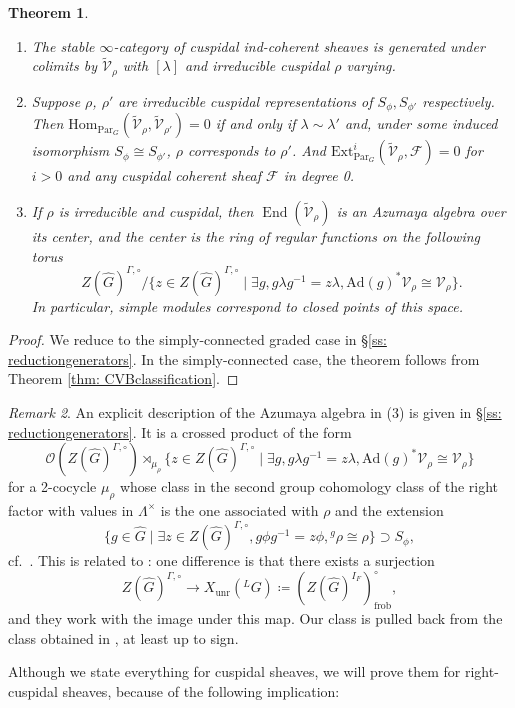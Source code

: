 \documentclass{amsart}
\newtheorem{theorem}{Theorem}[subsection]
\theoremstyle{definition}
\theoremstyle{remark}
\newtheorem{remark}[theorem]{Remark}
\numberwithin{equation}{section}
\newcommand{\mc}{\mathcal}
\newcommand{\Hom}{\mathrm{Hom}}
\DeclareMathOperator{\End}{End}
\newcommand{\wh}{\widehat}
\newcommand{\frob}{\mathrm{frob}}
\newcommand{\Par}{\mathrm{Par}}
\begin{document}
\begin{theorem}\label{thm: Generators}
\begin{enumerate}
    \item The stable $\infty$-category of cuspidal ind-coherent sheaves is generated under colimits by $\widetilde{\mc V}_{\rho}$ with $[\lambda]$ and irreducible cuspidal $\rho$ varying.  
    \item Suppose $\rho$, $\rho'$ are irreducible cuspidal representations of $S_{\phi}, S_{\phi'}$ respectively. Then $\Hom_{\Par_G}(\widetilde{\mc V}_{\rho}, \widetilde{\mc V}_{\rho'})=0$ if and only if $\lambda \sim \lambda'$ and, under some induced isomorphism $S_{\phi}\cong S_{\phi'}$, $\rho$ corresponds to $\rho'$. And $\mathrm{Ext}^i_{\Par_G} (\widetilde{\mc V}_{\rho}, \mc F)=0$ for $i>0$ and any cuspidal coherent sheaf $\mc F$ in degree 0. 
    \item If $\rho$ is irreducible and cuspidal, then $\End (\widetilde{\mc V}_{\rho})$ is an Azumaya algebra over its center, and the center is the ring of regular functions on the following torus
    \[
    Z(\wh G)^{\Gamma, \circ}/\{z\in Z(\wh G)^{\Gamma, \circ}\mid \exists g, g\lambda g^{-1}=z\lambda,  \mathrm{Ad}(g)^* \mc V_\rho\cong \mc V_\rho\}. 
    \] 
    In particular, simple modules correspond to closed points of this space.
    \end{enumerate}
\end{theorem}
\begin{proof}
    We reduce to the simply-connected graded case in \S\ref{ss: reductiongenerators}. In the simply-connected case, the theorem follows from Theorem \ref{thm: CVBclassification}.
\end{proof}

\begin{remark}\label{rem: Azumaya}
An explicit description of the Azumaya algebra in (3) is given in \S\ref{ss: reductiongenerators}. It is a crossed product of the form
\[
\mc O(Z(\wh G)^{\Gamma,\circ})\rtimes_{\mu_\rho}
\{z\in Z(\wh G)^{\Gamma, \circ}\mid \exists g, g\lambda g^{-1}=z\lambda,  \mathrm{Ad}(g)^* \mc V_\rho\cong \mc V_\rho\}
\]
for a 2-cocycle $\mu_\rho$ whose class in the second group cohomology class of the right factor with values in $\Lambda^\times$ is the one associated with $\rho$ and the extension 
\[
\{g\in \wh G\mid \exists z\in Z(\wh G)^{\Gamma,\circ}, g\phi g^{-1}=z\phi, {}^g \rho\cong \rho\}\supset S_\phi, 
\]
cf.~\cite[Appendix A]{AbeOhara}. 
This is related to \cite{AbeOhara}: one difference is that there exists a surjection
\[
Z(\wh G)^{\Gamma,\circ} \to X_{\mathrm{unr}}({}^L G)\coloneq (Z(\wh G)^{I_F})_{\frob}^\circ, 
\]
and they work with the image under this map. Our class is pulled back from the class obtained in \cite[Proposition 4.1.6]{AbeOhara}, at least up to sign. 
\end{remark}
Although we state everything for cuspidal sheaves, we will prove them for right-cuspidal sheaves, because of the following implication:
\end{document}
